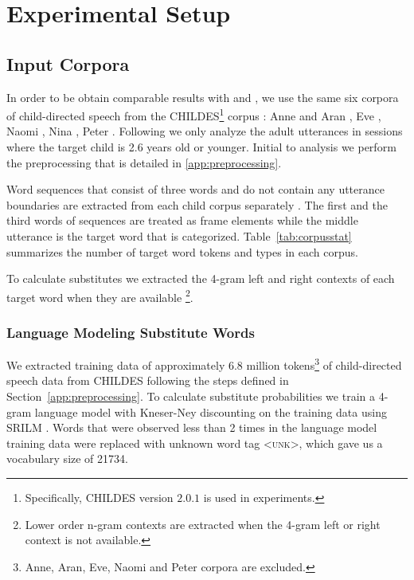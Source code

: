 \setcounter{ExperimentCounter}{1}
\section{Experimental Setup}
\subsection{Input Corpora}

In order to be obtain comparable results with \cite{clair2010} and
\cite{Mintz200391}, we use the same six corpora of child-directed speech from
the CHILDES\footnote{ Specifically, CHILDES version $2.0.1$ is used in
experiments.} corpus \citep*{macwhinney2000childes}: Anne and Aran
\citep*{theakston2001role}, Eve \citep*{JCL:1765112}, Naomi
\citep*{sachs1983talking}, Nina \citep*{suppes1974semantics}, Peter
\citep*{Bloom1974380, bloom1975structure}.  Following \cite{Mintz200391} we
only analyze the adult utterances in sessions where the target child is 2.6
years old or younger.  Initial to analysis we perform the preprocessing that is
detailed in \ref{app:preprocessing}.


Word sequences that consist of three words and do not contain any utterance
boundaries are extracted from each child corpus separately
\citep*{Mintz200391}.  The first and the third words of sequences are treated
as frame elements while the middle utterance is the target word that is
categorized.  Table~\ref{tab:corpusstat} summarizes the number of target word
tokens and types in each corpus.   

To calculate substitutes we extracted the 4-gram left and right contexts of
each target word when they are available \footnote{Lower order n-gram contexts
are extracted when the 4-gram left or right context is not available.}.

\subsubsection{Language Modeling Substitute Words}
\label{s:lm}
We extracted training data of approximately 6.8 million tokens\footnote{Anne,
Aran, Eve, Naomi and Peter corpora are excluded.} of child-directed speech data
from CHILDES following the steps defined in Section~\ref{app:preprocessing}.
To calculate substitute probabilities we train a 4-gram language model with
Kneser-Ney discounting on the training data using SRILM \citep*{Stolcke2002}.
Words that were observed less than 2 times in the language model training data
were replaced with unknown word tag \textsc{<unk>}, which gave us a vocabulary
size of 21734.

